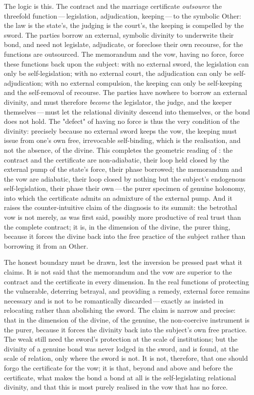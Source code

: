 The logic is this. The contract and the marriage certificate \emph{outsource} the threefold function\,---\,legislation, adjudication, keeping\,---\,to the symbolic Other: the law is the state's, the judging is the court's, the keeping is compelled by the sword. The parties borrow an external, symbolic divinity to underwrite their bond, and need not legislate, adjudicate, or foreclose their own recourse, for the functions are outsourced. The memorandum and the vow, having no force, force these functions back upon the subject: with no external sword, the legislation can only be self-legislation; with no external court, the adjudication can only be self-adjudication; with no external compulsion, the keeping can only be self-keeping and the self-removal of recourse. The parties have nowhere to borrow an external divinity, and must therefore \emph{become} the legislator, the judge, and the keeper themselves\,---\,must let the relational divinity descend into themselves, or the bond does not hold. The "defect" of having no force is thus the very condition of the divinity: precisely because no external sword keeps the vow, the keeping must issue from one's own free, irrevocable self-binding, which is the realisation, and not the absence, of the divine. This completes the geometric reading of : the contract and the certificate are non-adiabatic, their loop held closed by the external pump of the state's force, their phase borrowed; the memorandum and the vow are adiabatic, their loop closed by nothing but the subject's endogenous self-legislation, their phase their own\,---\,the purer specimen of genuine holonomy, into which the certificate admits an admixture of the external pump. And it raises the counter-intuitive claim of the diagnosis to its summit: the betrothal vow is not merely, as was first said, possibly more productive of real trust than the complete contract; it is, in the dimension of the divine, the purer thing, because it forces the divine back into the free practice of the subject rather than borrowing it from an Other.

The honest boundary must be drawn, lest the inversion be pressed past what it claims. It is not said that the memorandum and the vow are superior to the contract and the certificate in every dimension. In the real functions of protecting the vulnerable, deterring betrayal, and providing a remedy, external force remains necessary and is not to be romantically discarded\,---\,exactly as  insisted in relocating rather than abolishing the sword. The claim is narrow and precise: that in the dimension of the divine, of the genuine, the non-coercive instrument is the purer, because it forces the divinity back into the subject's own free practice. The weak still need the sword's protection at the scale of institutions; but the divinity of a genuine bond was never lodged in the sword, and is found, at the scale of relation, only where the sword is not. It is not, therefore, that one should forgo the certificate for the vow; it is that, beyond and above and before the certificate, what makes the bond a bond at all is the self-legislating relational divinity, and that this is most purely realised in the vow that has no force.

